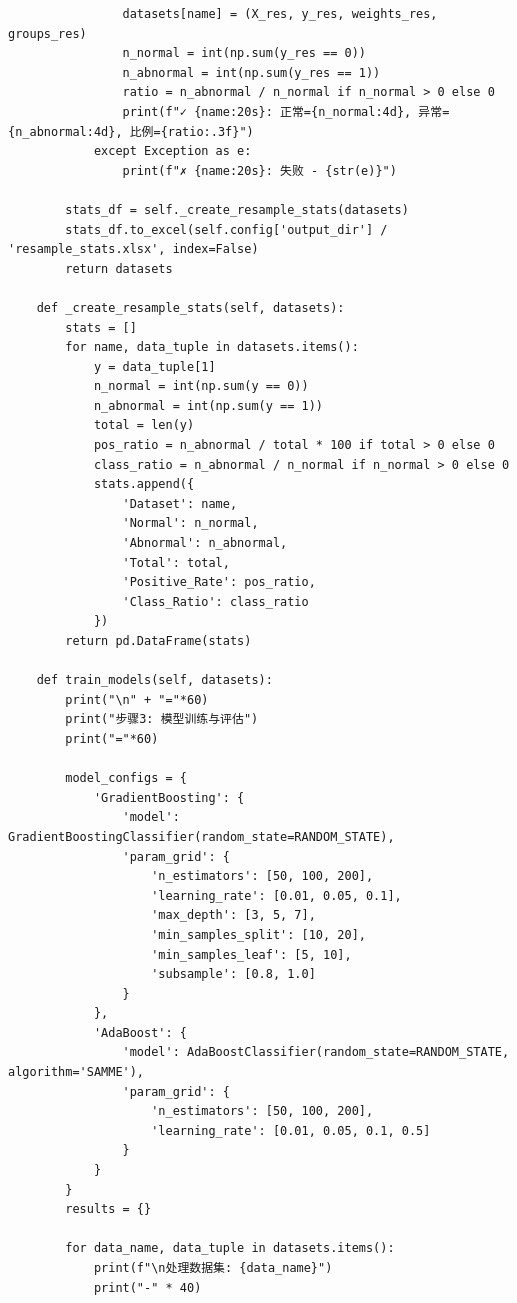 \begin{lstlisting}
                datasets[name] = (X_res, y_res, weights_res, groups_res)
                n_normal = int(np.sum(y_res == 0))
                n_abnormal = int(np.sum(y_res == 1))
                ratio = n_abnormal / n_normal if n_normal > 0 else 0
                print(f"✓ {name:20s}: 正常={n_normal:4d}, 异常={n_abnormal:4d}, 比例={ratio:.3f}")
            except Exception as e:
                print(f"✗ {name:20s}: 失败 - {str(e)}")

        stats_df = self._create_resample_stats(datasets)
        stats_df.to_excel(self.config['output_dir'] / 'resample_stats.xlsx', index=False)
        return datasets

    def _create_resample_stats(self, datasets):
        stats = []
        for name, data_tuple in datasets.items():
            y = data_tuple[1]
            n_normal = int(np.sum(y == 0))
            n_abnormal = int(np.sum(y == 1))
            total = len(y)
            pos_ratio = n_abnormal / total * 100 if total > 0 else 0
            class_ratio = n_abnormal / n_normal if n_normal > 0 else 0
            stats.append({
                'Dataset': name,
                'Normal': n_normal,
                'Abnormal': n_abnormal,
                'Total': total,
                'Positive_Rate': pos_ratio,
                'Class_Ratio': class_ratio
            })
        return pd.DataFrame(stats)

    def train_models(self, datasets):
        print("\n" + "="*60)
        print("步骤3: 模型训练与评估")
        print("="*60)

        model_configs = {
            'GradientBoosting': {
                'model': GradientBoostingClassifier(random_state=RANDOM_STATE),
                'param_grid': {
                    'n_estimators': [50, 100, 200],
                    'learning_rate': [0.01, 0.05, 0.1],
                    'max_depth': [3, 5, 7],
                    'min_samples_split': [10, 20],
                    'min_samples_leaf': [5, 10],
                    'subsample': [0.8, 1.0]
                }
            },
            'AdaBoost': {
                'model': AdaBoostClassifier(random_state=RANDOM_STATE, algorithm='SAMME'),
                'param_grid': {
                    'n_estimators': [50, 100, 200],
                    'learning_rate': [0.01, 0.05, 0.1, 0.5]
                }
            }
        }
        results = {}

        for data_name, data_tuple in datasets.items():
            print(f"\n处理数据集: {data_name}")
            print("-" * 40)


\end{lstlisting}

